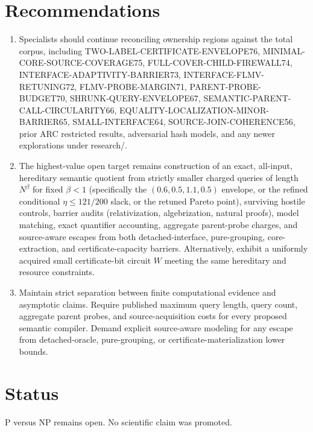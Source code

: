 \documentclass[11pt]{article}
\begin{document}
\section{Recommendations}
\begin{enumerate}
\item Specialists should continue reconciling ownership regions against the total corpus, including TWO-LABEL-CERTIFICATE-ENVELOPE76, MINIMAL-CORE-SOURCE-COVERAGE75, FULL-COVER-CHILD-FIREWALL74, INTERFACE-ADAPTIVITY-BARRIER73, INTERFACE-FLMV-RETUNING72, FLMV-PROBE-MARGIN71, PARENT-PROBE-BUDGET70, SHRUNK-QUERY-ENVELOPE67, SEMANTIC-PARENT-CALL-CIRCULARITY66, EQUALITY-LOCALIZATION-MINOR-BARRIER65, SMALL-INTERFACE64, SOURCE-JOIN-COHERENCE56, prior ARC restricted results, adversarial hash models, and any newer explorations under research/.
\item The highest-value open target remains construction of an exact, all-input, hereditary semantic quotient from strictly smaller charged queries of length $N^\beta$ for fixed $\beta<1$ (specifically the $(0.6,0.5,1.1,0.5)$ envelope, or the refined conditional $\eta\le 121/200$ slack, or the retuned Pareto point), surviving hostile controls, barrier audits (relativization, algebrization, natural proofs), model matching, exact quantifier accounting, aggregate parent-probe charges, and source-aware escapes from both detached-interface, pure-grouping, core-extraction, and certificate-capacity barriers. Alternatively, exhibit a uniformly acquired small certificate-bit circuit $W$ meeting the same hereditary and resource constraints.
\item Maintain strict separation between finite computational evidence and asymptotic claims. Require published maximum query length, query count, aggregate parent probes, and source-acquisition costs for every proposed semantic compiler. Demand explicit source-aware modeling for any escape from detached-oracle, pure-grouping, or certificate-materialization lower bounds.
\end{enumerate}

\section{Status}
P versus NP remains open. No scientific claim was promoted.

\end{document}

